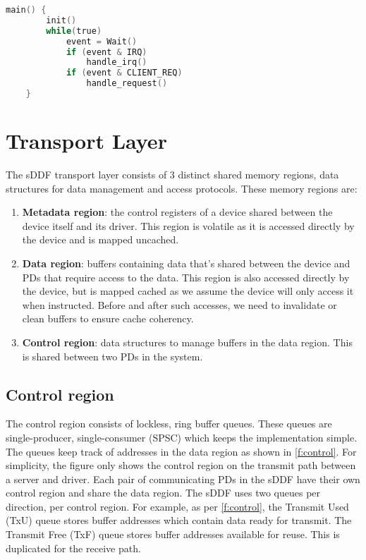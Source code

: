 \begin{lstlisting}[tabsize=2, language=C, caption={Driver pseudo code},frame=tb, label={l:driver_pseudo}, captionpos=b]
    main() {
        init()
        while(true)
            event = Wait()
            if (event & IRQ)
                handle_irq()
            if (event & CLIENT_REQ)
                handle_request()
    }
\end{lstlisting}

\section{Transport Layer}
The sDDF transport layer consists of 3 distinct shared memory regions, data structures for data management
and access protocols. These memory regions are:
\begin{enumerate}
    \item \textbf{Metadata region}: the control registers of a device shared between the device itself and its driver. 
    This region is volatile as it is accessed directly by the device and is mapped uncached. 
    \item \textbf{Data region}: buffers containing data that's shared between the device and PDs that require access to the data.
    This region is also accessed directly by the device, but is mapped cached as we assume the device will only access it when 
    instructed. Before and after such accesses, we need to invalidate or clean buffers to ensure cache coherency.
    \item \textbf{Control region}: data structures to manage buffers in the data region. This is shared between two PDs in the system. 
\end{enumerate}

\subsection{Control region}
The control region consists of lockless, ring buffer queues. These queues are single-producer,
single-consumer (SPSC) which keeps the implementation simple.
The queues keep track of addresses in the data region as shown in \autoref{f:control}. For simplicity,
the figure only shows the control region on the transmit path between a server and driver. Each pair of 
communicating PDs in the sDDF have their own control region and share the data region. 
The sDDF uses two queues per direction, per control region. For example, as per \autoref{f:control}, the 
Transmit Used (TxU) queue stores buffer addresses which contain data ready for transmit. 
The Transmit Free (TxF) queue stores buffer addresses available for reuse. This is duplicated for the receive path.

